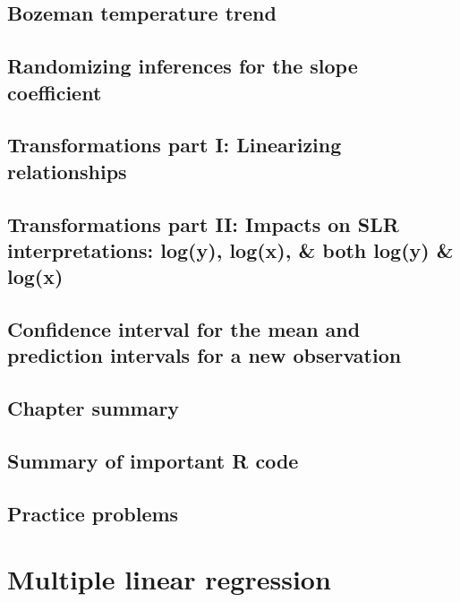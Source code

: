 \documentclass[]{book}
\begin{document}
\hypertarget{section7-3}{%
\section{Bozeman temperature trend}\label{section7-3}}

\hypertarget{section7-4}{%
\section{Randomizing inferences for the slope coefficient}\label{section7-4}}

\hypertarget{section7-5}{%
\section{Transformations part I: Linearizing relationships}\label{section7-5}}

\hypertarget{section7-6}{%
\section{Transformations part II: Impacts on SLR interpretations: log(y), log(x), \& both log(y) \& log(x)}\label{section7-6}}

\hypertarget{section7-7}{%
\section{Confidence interval for the mean and prediction intervals for a new observation}\label{section7-7}}

\hypertarget{section7-8}{%
\section{Chapter summary}\label{section7-8}}

\hypertarget{section7-9}{%
\section{Summary of important R code}\label{section7-9}}

\hypertarget{section7-10}{%
\section{Practice problems}\label{section7-10}}

\hypertarget{chapter8}{%
\chapter{Multiple linear regression}\label{chapter8}}
\end{document}
